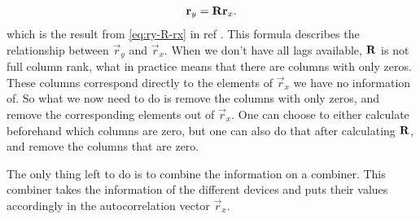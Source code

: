 \documentclass[a4paper, openany, oneside]{memoir}
\begin{document}
\begin{align} %
    \vec{r}_y = \mat{R} \vec{r}_x.
\end{align}
which is the result from \cref{eq:ry-R-rx} in ref . This formula describes the relationship between $\vec{r}_y$ and $\vec{r}_x$. When we don't have all lags available, $\boldsymbol{\mathbf{R}}$ is not full column rank, what in practice means that there are columns with only zeros. These columns correspond directly to the elements of $\vec{r}_x$ we have no information of. So what we now need to do is remove the columns with only zeros, and remove the corresponding elements out of $\vec{r}_x$. One can choose to either calculate beforehand which columns are zero, but one can also do that after calculating $\boldsymbol{\mathbf{R}}$, and remove the columns that are zero. 

The only thing left to do is to combine the information on a combiner. This combiner takes the information of the different devices and puts their values accordingly in the autocorrelation vector $\vec{r}_x$. 
\end{document}
